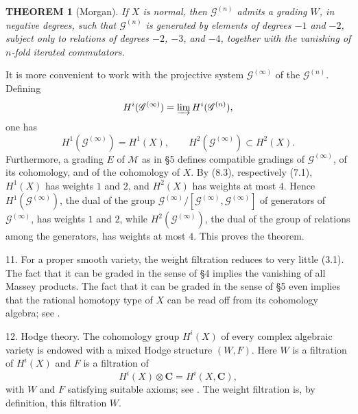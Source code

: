 \documentclass[10pt]{amsart}
\theoremstyle{plain}
\newtheorem{theorem}{THEOREM}
\theoremstyle{definition}
\theoremstyle{remark}
\begin{document}
\begin{theorem}[Morgan]
If $X$ is normal, then $\mathscr G^{(n)}$ admits a grading $W$, in negative degrees, such that $\mathscr G^{(n)}$ is generated by elements of degrees $-1$ and $-2$, subject only to relations of degrees $-2$, $-3$, and $-4$, together with the vanishing of $n$-fold iterated commutators.
\end{theorem}

It is more convenient to work with the projective system $\mathscr G^{(\infty)}$ of the $\mathscr G^{(n)}$. Defining
\[
H^i(\mathscr G^{(\infty)})=\varinjlim H^i(\mathscr G^{(n)}),
\]
one has
\[
H^1(\mathscr G^{(\infty)})=H^1(X),
\qquad
H^2(\mathscr G^{(\infty)})\subset H^2(X).
\]
Furthermore, a grading $E$ of $\mathscr M$ as in \S 5 defines compatible gradings of $\mathscr G^{(\infty)}$, of its cohomology, and of the cohomology of $X$. By (8.3), respectively (7.1), $H^1(X)$ has weights $1$ and $2$, and $H^2(X)$ has weights at most $4$. Hence $H^1(\mathscr G^{(\infty)})$, the dual of the group $\mathscr G^{(\infty)}/[\mathscr G^{(\infty)},\mathscr G^{(\infty)}]$ of generators of $\mathscr G^{(\infty)}$, has weights $1$ and $2$, while $H^2(\mathscr G^{(\infty)})$, the dual of the group of relations among the generators, has weights at most $4$. This proves the theorem.

11. For a proper smooth variety, the weight filtration reduces to very little (3.1). The fact that it can be graded in the sense of \S 4 implies the vanishing of all Massey products. The fact that it can be graded in the sense of \S 5 even implies that the rational homotopy type of $X$ can be read off from its cohomology algebra; see \cite{DGMS}.

12. Hodge theory. The cohomology group $H^i(X)$ of every complex algebraic variety is endowed with a mixed Hodge structure $(W,F)$. Here $W$ is a filtration of $H^i(X)$ and $F$ is a filtration of
\[
H^i(X)\otimes\mathbf C=H^i(X,\mathbf C),
\]
with $W$ and $F$ satisfying suitable axioms; see \cite{D1}. The weight filtration is, by definition, this filtration $W$.
\end{document}

